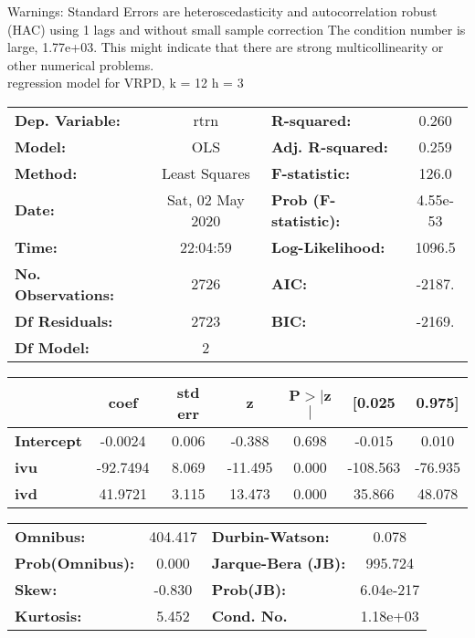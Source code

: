 Warnings: \newline
 [1] Standard Errors are heteroscedasticity and autocorrelation robust (HAC) using 1 lags and without small sample correction \newline
 [2] The condition number is large, 1.77e+03. This might indicate that there are \newline
 strong multicollinearity or other numerical problems.\\ 

regression model for VRPD, k = 12 h = 3\begin{center}
\begin{tabular}{lclc}
\toprule
\textbf{Dep. Variable:}    &       rtrn       & \textbf{  R-squared:         } &     0.260   \\
\textbf{Model:}            &       OLS        & \textbf{  Adj. R-squared:    } &     0.259   \\
\textbf{Method:}           &  Least Squares   & \textbf{  F-statistic:       } &     126.0   \\
\textbf{Date:}             & Sat, 02 May 2020 & \textbf{  Prob (F-statistic):} &  4.55e-53   \\
\textbf{Time:}             &     22:04:59     & \textbf{  Log-Likelihood:    } &    1096.5   \\
\textbf{No. Observations:} &        2726      & \textbf{  AIC:               } &    -2187.   \\
\textbf{Df Residuals:}     &        2723      & \textbf{  BIC:               } &    -2169.   \\
\textbf{Df Model:}         &           2      & \textbf{                     } &             \\
\bottomrule
\end{tabular}
\begin{tabular}{lcccccc}
                   & \textbf{coef} & \textbf{std err} & \textbf{z} & \textbf{P$> |$z$|$} & \textbf{[0.025} & \textbf{0.975]}  \\
\midrule
\textbf{Intercept} &      -0.0024  &        0.006     &    -0.388  &         0.698        &       -0.015    &        0.010     \\
\textbf{ivu}       &     -92.7494  &        8.069     &   -11.495  &         0.000        &     -108.563    &      -76.935     \\
\textbf{ivd}       &      41.9721  &        3.115     &    13.473  &         0.000        &       35.866    &       48.078     \\
\bottomrule
\end{tabular}
\begin{tabular}{lclc}
\textbf{Omnibus:}       & 404.417 & \textbf{  Durbin-Watson:     } &     0.078  \\
\textbf{Prob(Omnibus):} &   0.000 & \textbf{  Jarque-Bera (JB):  } &   995.724  \\
\textbf{Skew:}          &  -0.830 & \textbf{  Prob(JB):          } & 6.04e-217  \\
\textbf{Kurtosis:}      &   5.452 & \textbf{  Cond. No.          } &  1.18e+03  \\
\bottomrule
\end{tabular}
\end{center}

